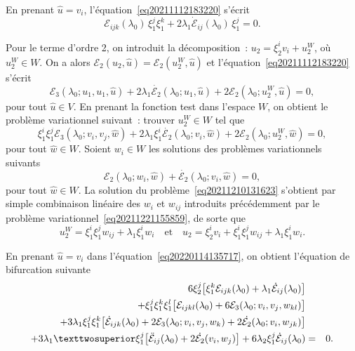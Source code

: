 \documentclass[12pt, final]{amsart}
\begin{document}
En prenant \(\hat{u}=v_i\), l'équation~\eqref{eq20211112183220} s'écrit
\begin{equation}
  \label{eq20220216140121}
  \mathcal E_{ijk}(\lambda _0)\,\xi _1^j\xi _1^k+2\lambda _1\dot{\mathcal E}_{ij}(\lambda _0)\,\xi _1^j=0.
\end{equation}

Pour le terme d'ordre 2, on introduit la décomposition~:
\(u_2=\xi _2^iv_i+u_2^W\), où \(u_2^W\in W\). On a alors
\(\mathcal E_2(u_2, \hat{u})=\mathcal E_2(u_2^W, \hat{u})\) et l'équation~\eqref{eq20211112183220}
s'écrit
\begin{equation}
  \mathcal E_3(\lambda _0; u_1, u_1, \hat{u})+2\lambda _1\dot{\mathcal E_2}(\lambda _0; u_1, \hat{u})
  +2\mathcal E_2(\lambda _0; u_2^W, \hat{u})=0,
\end{equation}
pour tout \(\hat{u}\in V\). En prenant la fonction test dans l'espace \(W\), on
obtient le problème variationnel suivant~: trouver \(u_2^W\in W\) tel que
\begin{equation}
  \label{eq20211210131623}
  \xi _1^i\xi _1^j\mathcal E_3(\lambda _0; v_i, v_j, \hat{w})
  +2\lambda _1\xi _1^i\dot{\mathcal E_2}(\lambda _0; v_i, \hat{w})
  +2\mathcal E_2(\lambda _0; u_2^W, \hat{w})=0,
\end{equation}
pour tout \(\hat{w}\in W\). Soient \(w_i\in W\) les solutions des problèmes
variationnels suivants
\begin{equation}
  \label{eq20220208143055}
  \mathcal E_2(\lambda _0; w_i, \hat{w})+\dot{\mathcal E_2}(\lambda _0; v_i, \hat{w})=0,
\end{equation}
pour tout \(\hat{w}\in W\). La solution du problème~\eqref{eq20211210131623}
s'obtient par simple combinaison linéaire des \(w_i\) et \(w_{ij}\) introduits
précédemment par le problème variationnel~\eqref{eq20211221155859}, de sorte
que
\begin{equation}
  \label{eq20220124135324}
  u_2^W=\xi _1^i\xi _1^jw_{ij}+\lambda _1\xi _1^i w_i
  \quad\text{et}\quad
  u_2=\xi _2^iv_i+\xi _1^i\xi _1^jw_{ij}+\lambda _1\xi _1^i w_i.
\end{equation}

En prenant \(\hat{u}=v_i\) dans l'équation~\eqref{eq20220114135717}, on
obtient l'équation de bifurcation suivante
\begin{eqnarray}
  \notag
  6\xi _2^j\bigl[\xi _1^k\mathcal E_{ijk}(\lambda _0)+\lambda _1\dot{\mathcal E}_{ij}(\lambda _0)\bigr]&&\\
  \notag
  +\xi _1^j\xi _1^k\xi _1^l\bigl[\mathcal E_{ijkl}(\lambda _0)+6\mathcal E_3(\lambda _0; v_i, v_j, w_{kl})\bigr]&&\\
  \notag
    +3\lambda _1\xi _1^j\xi _1^k\bigl[\dot{\mathcal E}_{ijk}(\lambda _0)+2\mathcal E_3(\lambda _0; v_i, v_j, w_k)
    +2\dot{\mathcal E_2}(\lambda _0; v_i, w_{jk})\bigr]&&\\
    \label{eq20220210143805}
    +3\lambda _1²\xi _1^j\bigl[\ddot{\mathcal E}_{ij}(\lambda _0)+2\dot{\mathcal E_2}(v_i, w_j)\bigr]
    +6\lambda _2\xi _1^j\dot{\mathcal E}_{ij}(\lambda _0)
    &=&0.
\end{eqnarray}
\end{document}
